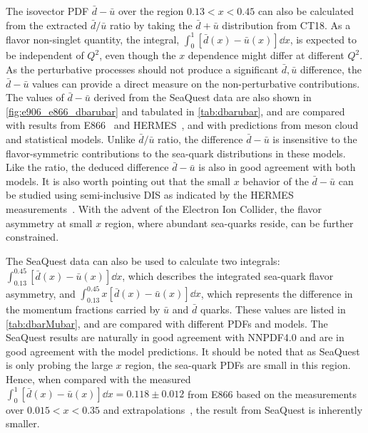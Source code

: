 \documentclass[reprint,aps,unsortedaddress,superscriptaddress,prl,floatfix,showpacs,linenumbers,final]{revtex4-2}
\def\,{}%
\begin{document}
The isovector PDF $\bar{d}-\bar{u}$ over the region $0.13<x<0.45$
can also be calculated from the extracted $\bar{d}/\bar{u}$ ratio by taking the $\bar{d}+\bar{u}$
distribution from CT18.
As a flavor non-singlet quantity, the integral, $\int^1_0 \left[\bar{d}\left(x\right) - \bar{u}\left(x\right)\right] \dd{x}$,
is expected to be independent of $Q^2$, even though the $x$ dependence might differ at different $Q^2$.
As the perturbative processes should not produce a significant $\bar{d},\,\bar{u}$ difference,
the $\bar{d}-\bar{u}$ values can provide a direct measure on the non-perturbative contributions.
The values of $\bar{d}-\bar{u}$ derived from the SeaQuest data are also shown in \cref{fig:e906_e866_dbarubar} and tabulated in \cref{tab:dbarubar},
and are compared with results from E866~\cite{towell2001} and HERMES~\cite{ackerstaff1998},
and with predictions from meson cloud and statistical models.
Unlike $\bar{d}/\bar{u}$ ratio, the difference $\bar{d}-\bar{u}$ is insensitive to the flavor-symmetric contributions
to the sea-quark distributions in these models. Like the ratio, the deduced difference $\bar{d}-\bar{u}$ is also
in good agreement with both models.
It is also worth pointing out that the small $x$ behavior of the $\bar{d}-\bar{u}$ can be studied using
semi-inclusive DIS as indicated by the HERMES measurements~\cite{ackerstaff1998}.
With the advent of the Electron Ion Collider, the flavor asymmetry at small $x$ region, where abundant sea-quarks reside,
can be further constrained.

The SeaQuest data can also be used to calculate two integrals: $\int^{0.45}_{0.13} \left[\bar{d}\left(x\right) - \bar{u}\left(x\right) \right]\dd{x}$,
which describes the integrated sea-quark flavor asymmetry, and $\int^{0.45}_{0.13} x\left[\bar{d}\left(x\right) - \bar{u}\left(x\right) \right]\dd{x}$,
which represents the difference in the momentum fractions carried by $\bar{u}$ and $\bar{d}$ quarks.
These values are listed in \cref{tab:dbarMubar}, and are compared with different PDFs and models.
The SeaQuest results are naturally in good agreement with NNPDF4.0 and are in good agreement with the model predictions.
It should be noted that as SeaQuest is only probing the large $x$ region, the sea-quark PDFs are small in this region.
Hence, when compared with the measured $\int^{1}_{0} \left[\bar{d}\left(x\right) - \bar{u}\left(x\right) \right]\dd{x}=0.118\pm 0.012$
from E866 based on the measurements over $0.015<x<0.35$ and extrapolations~\cite{towell2001},
the result from SeaQuest is inherently smaller.
\end{document}
